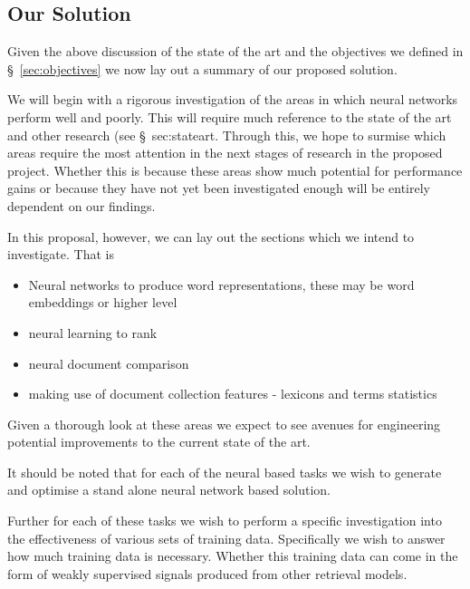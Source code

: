 \documentclass[11pt,english,twocolumn]{article}
\begin{document}
\subsection{Our Solution}
Given the above discussion of the state of the art and the objectives we defined in \S~\ref{sec:objectives} we now lay out a summary of our proposed solution.

We will begin with a rigorous investigation of the areas in which neural networks perform well and poorly. This will require much reference to the state of the art and other research (see \S~{sec:stateart}. Through this, we hope to surmise which areas require the most attention in the next stages of research in the proposed project. Whether this is because these areas show much potential for performance gains or because they have not yet been investigated enough will be entirely dependent on our findings.

In this proposal, however, we can lay out the sections which we intend to investigate. That is
\begin{itemize}
\item{Neural networks to produce word representations, these may be word embeddings or higher level}
\item{neural learning to rank}
\item{neural document comparison}
\item{making use of document collection features - lexicons and terms statistics}
\end{itemize}

Given a thorough look at these areas we expect to see avenues for engineering potential improvements to the current state of the art.

It should be noted that for each of the neural based tasks we wish to generate and optimise a stand alone neural network based solution.

Further for each of these tasks we wish to perform a specific investigation into the effectiveness of various sets of training data. Specifically we wish to answer how much training data is necessary. Whether this training data can come in the form of weakly supervised signals produced from other retrieval models.
\end{document}
